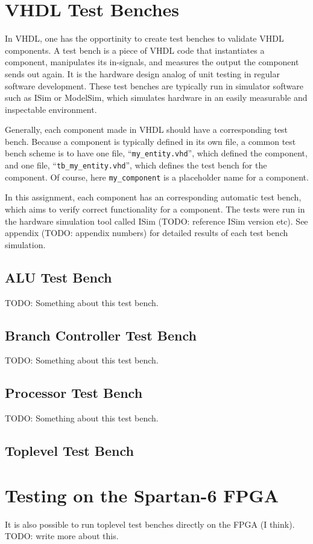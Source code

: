 \section{VHDL Test Benches}

In VHDL, one has the opportinity to create test benches to validate VHDL components.
A test bench is a piece of VHDL code that instantiates a component, manipulates its in-signals, and measures the output the component sends out again.
It is the hardware design analog of unit testing in regular software development.
These test benches are typically run in simulator software such as ISim or ModelSim, which simulates hardware in an easily measurable and inspectable environment.

Generally, each component made in VHDL should have a corresponding test bench.
Because a component is typically defined in its own file, a common test bench scheme is to have one file, ``\texttt{my\_entity.vhd}'', which defined the component, and one file, ``\texttt{tb\_my\_entity.vhd}'', which defines the test bench for the component.
Of course, here \texttt{my\_component} is a placeholder name for a component.

In this assignment, each component has an corresponding automatic test bench, which aims to verify correct functionality for a component.
The tests were run in the hardware simulation tool called ISim (TODO: reference ISim version etc).
See appendix (TODO: appendix numbers) for detailed results of each test bench simulation.

\subsection{ALU Test Bench}

TODO: Something about this test bench.

\subsection{Branch Controller Test Bench}

TODO: Something about this test bench.

\subsection{Processor Test Bench}

TODO: Something about this test bench.

\subsection{Toplevel Test Bench}



\section{Testing on the Spartan-6 FPGA}

It is also possible to run toplevel test benches directly on the FPGA (I think).
TODO: write more about this.
